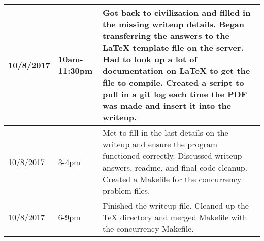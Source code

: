 \documentclass[letterpaper,10pt]{article}
\begin{document}
\begin{tabular}{ |p{2.5cm}|p{2.5cm}|p{9cm}| }
   \hline
   10/8/2017 & 10am-11:30pm & Got back to civilization and filled in the missing writeup details. Began transferring the answers to the LaTeX template file on the server. Had to look up a lot of documentation on LaTeX to get the file to compile. Created a script to pull in a git log each time the PDF was made and insert it into the writeup.\\
   \hline
   10/8/2017 & 3-4pm & Met to fill in the last details on the writeup and ensure the program functioned correctly. Discussed writeup answers, readme, and final code cleanup. Created a Makefile for the concurrency problem files.\\
   \hline
   10/8/2017 & 6-9pm & Finished the writeup file. Cleaned up the TeX directory and merged Makefile with the concurrency Makefile.\\
   \hline
\end{tabular}
\end{document}
